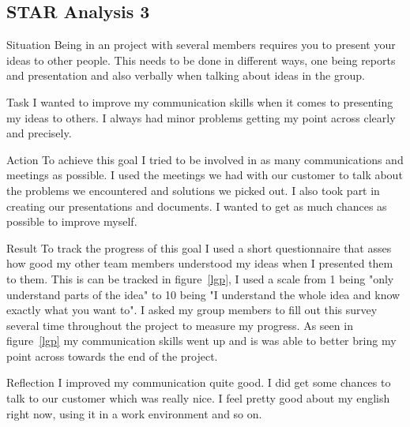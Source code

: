 \documentclass[12pt]{article}
\begin{document}
\subsection{STAR Analysis 3}
\begin{STAR}
    \item[Situation] Being in an project with several members requires you to present your ideas to other people. This needs to be done in different ways, one being reports and presentation and also verbally when talking about ideas in the group.
    \item[Task]
    I wanted to improve my communication skills when it comes to presenting my ideas to others. I always had minor problems getting my point across clearly and precisely.
    \item[Action] To achieve this goal I tried to be involved in as many communications and meetings as possible. I used the meetings we had with our customer to talk about the problems we encountered and solutions we picked out. I also took part in creating our presentations and documents. I wanted to get as much chances as possible to improve myself.
    \item[Result]
    To track the progress of this goal I used a short questionnaire that asses how good my other team members understood my ideas when I presented them to them. This is can be tracked in figure~\ref{lgp}, I used a scale from 1 being "only understand parts of the idea" to 10 being "I understand the whole idea and know exactly what you want to". I asked my group members to fill out this survey several time throughout the project to measure my progress. As seen in figure~\ref{lgp} my communication skills went up and is was able to better bring my point across towards the end of the project.
    \item[Reflection] I improved my communication quite good. I did get some chances to talk to our customer which was really nice. I feel pretty good about my english right now, using it in a work environment and so on.
\end{STAR}



%
\end{document}
